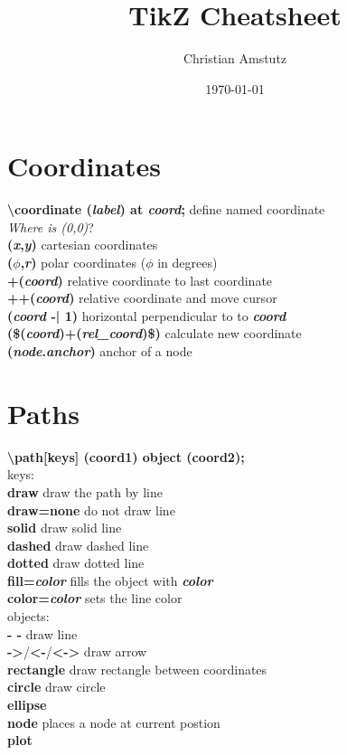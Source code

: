 \documentclass[10pt]{article}
\title{TikZ Cheatsheet}
\author{Christian Amstutz}
\date{\today}
\newcommand{\tikzcmd}[1]{\textbf{#1}}
\newcommand{\tikzparam}[1]{\textbf{\emph{#1}}}
\begin{document}
    \maketitle

    \begin{multicols}{2}

        \section{Coordinates}
        \tikzcmd{\textbackslash coordinate (\tikzparam{label}) at \tikzparam{coord};} define named coordinate\\
        \emph{Where is (0,0)}?\\
        \tikzcmd{(\tikzparam{x},\tikzparam{y})} cartesian coordinates\\
        \tikzcmd{(\tikzparam{$\phi$},\tikzparam{r})} polar coordinates ($\phi$ in degrees)\\
        \tikzcmd{+(\tikzparam{coord})} relative coordinate to last coordinate\\
        \tikzcmd{++(\tikzparam{coord})} relative coordinate and move cursor\\
        \tikzcmd{(\tikzparam{coord} -| 1)} horizontal perpendicular to to \tikzparam{coord}\\
        \tikzcmd{(\$(\tikzparam{coord})+(\tikzparam{rel\_coord})\$)} calculate new coordinate \\
        \tikzcmd{(\tikzparam{node}.\tikzparam{anchor})} anchor of a node\\

        \section{Paths}
        \tikzcmd{\textbackslash path[keys] (coord1) object (coord2);}\\
        keys:\\
        \tikzcmd{draw} draw the path by line\\
        \tikzcmd{draw=none} do not draw line\\
        \tikzcmd{solid} draw solid line\\
        \tikzcmd{dashed} draw dashed line\\
        \tikzcmd{dotted} draw dotted line\\
        \tikzcmd{fill=\tikzparam{color}} fills the object with \tikzparam{color}\\
        \tikzcmd{color=\tikzparam{color}} sets the line color\\
        objects:\\
        \tikzcmd{- -} draw line\\
        \tikzcmd{->}/\tikzcmd{<-}/\tikzcmd{<->} draw arrow\\
        \tikzcmd{rectangle} draw rectangle between coordinates\\
        \tikzcmd{circle} draw circle\\
        \tikzcmd{ellipse}\\
        \tikzcmd{node} places a node at current postion\\
        \tikzcmd{plot}\\


\end{multicols}
\end{document}
